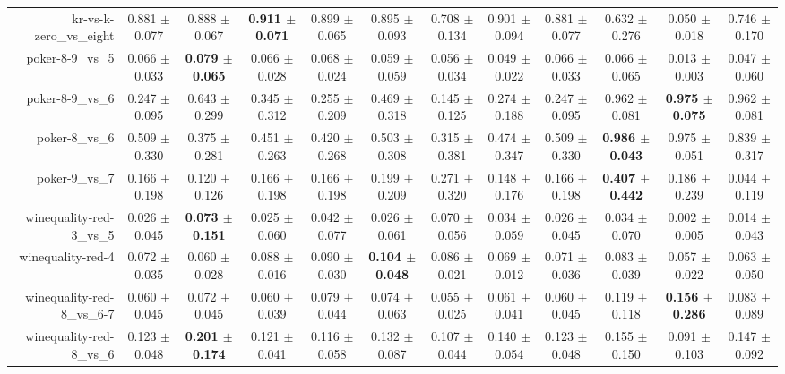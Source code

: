 \begin{table}[!ht]
{\begin{tabular}{r c c c c c c c c c c c}
kr-vs-k-zero\_vs\_eight & 0.881 $\pm$ 0.077 & 0.888 $\pm$ 0.067 & \textbf{0.911 $\pm$ 0.071} & 0.899 $\pm$ 0.065 & 0.895 $\pm$ 0.093 & 0.708 $\pm$ 0.134 & 0.901 $\pm$ 0.094 & 0.881 $\pm$ 0.077 & 0.632 $\pm$ 0.276 & 0.050 $\pm$ 0.018 & 0.746 $\pm$ 0.170 \\
poker-8-9\_vs\_5 & 0.066 $\pm$ 0.033 & \textbf{0.079 $\pm$ 0.065} & 0.066 $\pm$ 0.028 & 0.068 $\pm$ 0.024 & 0.059 $\pm$ 0.059 & 0.056 $\pm$ 0.034 & 0.049 $\pm$ 0.022 & 0.066 $\pm$ 0.033 & 0.066 $\pm$ 0.065 & 0.013 $\pm$ 0.003 & 0.047 $\pm$ 0.060 \\
poker-8-9\_vs\_6 & 0.247 $\pm$ 0.095 & 0.643 $\pm$ 0.299 & 0.345 $\pm$ 0.312 & 0.255 $\pm$ 0.209 & 0.469 $\pm$ 0.318 & 0.145 $\pm$ 0.125 & 0.274 $\pm$ 0.188 & 0.247 $\pm$ 0.095 & 0.962 $\pm$ 0.081 & \textbf{0.975 $\pm$ 0.075} & 0.962 $\pm$ 0.081 \\
poker-8\_vs\_6 & 0.509 $\pm$ 0.330 & 0.375 $\pm$ 0.281 & 0.451 $\pm$ 0.263 & 0.420 $\pm$ 0.268 & 0.503 $\pm$ 0.308 & 0.315 $\pm$ 0.381 & 0.474 $\pm$ 0.347 & 0.509 $\pm$ 0.330 & \textbf{0.986 $\pm$ 0.043} & 0.975 $\pm$ 0.051 & 0.839 $\pm$ 0.317 \\
poker-9\_vs\_7 & 0.166 $\pm$ 0.198 & 0.120 $\pm$ 0.126 & 0.166 $\pm$ 0.198 & 0.166 $\pm$ 0.198 & 0.199 $\pm$ 0.209 & 0.271 $\pm$ 0.320 & 0.148 $\pm$ 0.176 & 0.166 $\pm$ 0.198 & \textbf{0.407 $\pm$ 0.442} & 0.186 $\pm$ 0.239 & 0.044 $\pm$ 0.119 \\
winequality-red-3\_vs\_5 & 0.026 $\pm$ 0.045 & \textbf{0.073 $\pm$ 0.151} & 0.025 $\pm$ 0.060 & 0.042 $\pm$ 0.077 & 0.026 $\pm$ 0.061 & 0.070 $\pm$ 0.056 & 0.034 $\pm$ 0.059 & 0.026 $\pm$ 0.045 & 0.034 $\pm$ 0.070 & 0.002 $\pm$ 0.005 & 0.014 $\pm$ 0.043 \\
winequality-red-4 & 0.072 $\pm$ 0.035 & 0.060 $\pm$ 0.028 & 0.088 $\pm$ 0.016 & 0.090 $\pm$ 0.030 & \textbf{0.104 $\pm$ 0.048} & 0.086 $\pm$ 0.021 & 0.069 $\pm$ 0.012 & 0.071 $\pm$ 0.036 & 0.083 $\pm$ 0.039 & 0.057 $\pm$ 0.022 & 0.063 $\pm$ 0.050 \\
winequality-red-8\_vs\_6-7 & 0.060 $\pm$ 0.045 & 0.072 $\pm$ 0.045 & 0.060 $\pm$ 0.039 & 0.079 $\pm$ 0.044 & 0.074 $\pm$ 0.063 & 0.055 $\pm$ 0.025 & 0.061 $\pm$ 0.041 & 0.060 $\pm$ 0.045 & 0.119 $\pm$ 0.118 & \textbf{0.156 $\pm$ 0.286} & 0.083 $\pm$ 0.089 \\
winequality-red-8\_vs\_6 & 0.123 $\pm$ 0.048 & \textbf{0.201 $\pm$ 0.174} & 0.121 $\pm$ 0.041 & 0.116 $\pm$ 0.058 & 0.132 $\pm$ 0.087 & 0.107 $\pm$ 0.044 & 0.140 $\pm$ 0.054 & 0.123 $\pm$ 0.048 & 0.155 $\pm$ 0.150 & 0.091 $\pm$ 0.103 & 0.147 $\pm$ 0.092 \\

\end{tabular}}
\end{table}
